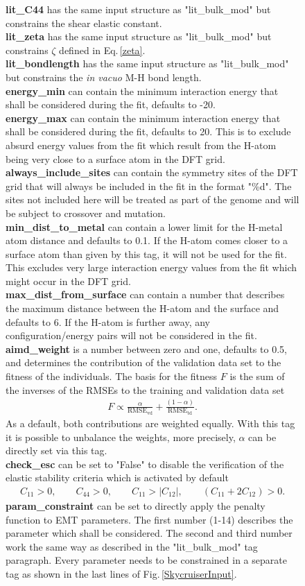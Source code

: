 \documentclass[twoside, 11pt, titlepage, captions=nooneline, a4paper, headsepline]{scrbook}%
\newcommand{\9}{\mathrm}
\newcommand{\0}{\,\mathrm}
\begin{document}
\begin{figure}[b!]
\textbf{lit\_C44} has the same input structure as "lit\_bulk\_mod" but constrains the shear elastic constant.\\
\textbf{lit\_zeta} has the same input structure as "lit\_bulk\_mod" but constrains $\zeta$ defined in Eq.\,\ref{zeta}.\\
\textbf{lit\_bondlength} has the same input structure as "lit\_bulk\_mod" but constrains the \textit{in vacuo} M-H bond length.\\
\textbf{energy\_min} can contain the minimum interaction energy that shall be considered during the fit, defaults to -20.\\
\textbf{energy\_max} can contain the minimum interaction energy that shall be considered during the fit, defaults to 20. This is to exclude absurd energy values from the fit which result from the H-atom being very close to a surface atom in the DFT grid.\\
\textbf{always\_include\_sites} can contain the symmetry sites of the DFT grid that will always be included in the fit in the format "\%d". The sites not included here will be treated as part of the genome and will be subject to crossover and mutation.\\
\textbf{min\_dist\_to\_metal} can contain a lower limit for the H-metal atom distance and defaults to 0.1. If the H-atom comes closer to a surface atom than given by this tag, it will not be used for the fit. This excludes very large interaction energy values from the fit which might occur in the DFT grid.\\
\textbf{max\_dist\_from\_surface} can contain a number that describes the maximum distance between the H-atom and the surface and defaults to 6. If the H-atom is further away, any configuration/energy pairs will not be considered in the fit.\\
\textbf{aimd\_weight} is a number between zero and one, defaults to 0.5, and determines the contribution of the validation data set to the fitness of the individuals. The basis for the fitness $F$ is the sum of the inverses of the RMSEs to the training and validation data set
\begin{align*}
	F \propto \frac{\alpha}{\9{RMSE}_\9{vd}} + \frac{(1-\alpha)}{\9{RMSE}_\9{td}}.
\end{align*}
As a default, both contributions are weighted equally. With this tag it is possible to unbalance the weights, more precisely, $\alpha$ can be directly set via this tag.\\
\textbf{check\_esc} can be set to "False" to disable the verification of the elastic stability criteria which is activated by default
\begin{align*}
	C_{11} > 0,\qquad C_{44} > 0,\qquad C_{11} > |C_{12}|,\qquad (C_{11} + 2C_{12}) > 0.
\end{align*}
\textbf{param\_constraint} can be set to directly apply the penalty function to EMT parameters. The first number (1-14) describes the parameter which shall be considered. The second and third number work the same way as described in the "lit\_bulk\_mod" tag paragraph. Every parameter needs to be constrained in a separate tag as shown in the last lines of Fig.\,\ref{SkycruiserInput}.


\end{figure}
\end{document}
